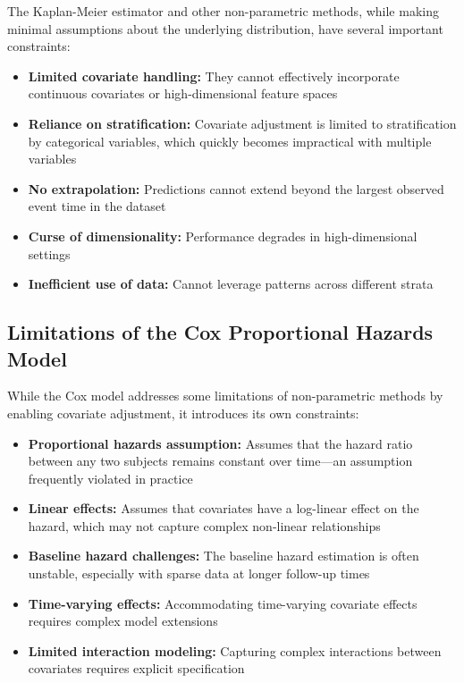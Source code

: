 The Kaplan-Meier estimator and other non-parametric methods, while making minimal assumptions about the underlying distribution, have several important constraints:

\begin{itemize}
    \item \textbf{Limited covariate handling:} They cannot effectively incorporate continuous covariates or high-dimensional feature spaces
    \item \textbf{Reliance on stratification:} Covariate adjustment is limited to stratification by categorical variables, which quickly becomes impractical with multiple variables
    \item \textbf{No extrapolation:} Predictions cannot extend beyond the largest observed event time in the dataset
    \item \textbf{Curse of dimensionality:} Performance degrades in high-dimensional settings
    \item \textbf{Inefficient use of data:} Cannot leverage patterns across different strata
\end{itemize}

\subsection{Limitations of the Cox Proportional Hazards Model}

While the Cox model addresses some limitations of non-parametric methods by enabling covariate adjustment, it introduces its own constraints:

\begin{itemize}
    \item \textbf{Proportional hazards assumption:} Assumes that the hazard ratio between any two subjects remains constant over time—an assumption frequently violated in practice
    \item \textbf{Linear effects:} Assumes that covariates have a log-linear effect on the hazard, which may not capture complex non-linear relationships
    \item \textbf{Baseline hazard challenges:} The baseline hazard estimation is often unstable, especially with sparse data at longer follow-up times
    \item \textbf{Time-varying effects:} Accommodating time-varying covariate effects requires complex model extensions
    \item \textbf{Limited interaction modeling:} Capturing complex interactions between covariates requires explicit specification
\end{itemize}

